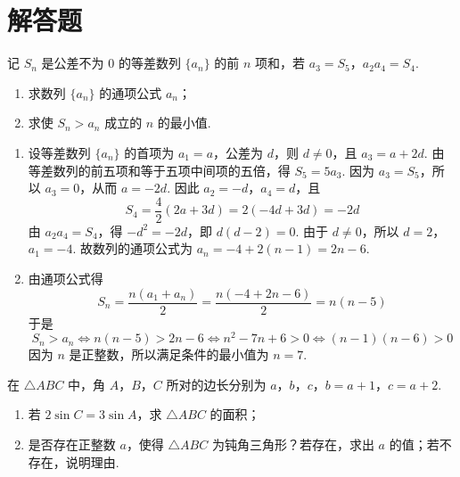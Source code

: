 \section{解答题}

\begin{problem}
记 \(S_n\) 是公差不为 \(0\) 的等差数列 \(\{a_n\}\) 的前 \(n\) 项和，若 \(a_3=S_5\)，\(a_2a_4=S_4\).

\begin{enumerate}
\item 求数列 \(\{a_n\}\) 的通项公式 \(a_n\)；
\item 求使 \(S_n>a_n\) 成立的 \(n\) 的最小值.
\end{enumerate}
\end{problem}

\begin{solution}
\begin{enumerate}
\item 设等差数列 \(\{a_n\}\) 的首项为 \(a_1=a\)，公差为 \(d\)，则 \(d\ne0\)，且 \(a_3=a+2d\). 由等差数列的前五项和等于五项中间项的五倍，得 \(S_5=5a_3\). 因为 \(a_3=S_5\)，所以 \(a_3=0\)，从而 \(a=-2d\). 因此 \(a_2=-d\)，\(a_4=d\)，且
\[
S_4=\frac{4}{2}\left(2a+3d\right)=2\left(-4d+3d\right)=-2d
\]
由 \(a_2a_4=S_4\)，得 \(-d^2=-2d\)，即 \(d(d-2)=0\). 由于 \(d\ne0\)，所以 \(d=2\)，\(a_1=-4\). 故数列的通项公式为 \(a_n=-4+2(n-1)=2n-6\).

\item 由通项公式得
\[
S_n=\frac{n\left(a_1+a_n\right)}{2}=\frac{n\left(-4+2n-6\right)}{2}=n(n-5)
\]
于是
\[
S_n>a_n\iff n(n-5)>2n-6\iff n^2-7n+6>0\iff (n-1)(n-6)>0
\]
因为 \(n\) 是正整数，所以满足条件的最小值为 \(n=7\).
\end{enumerate}
\end{solution}


\begin{problem}
在 \(\triangle ABC\) 中，角 \(A\)，\(B\)，\(C\) 所对的边长分别为 \(a\)，\(b\)，\(c\)，\(b=a+1\)，\(c=a+2\).

\begin{enumerate}
\item 若 \(2\sin C=3\sin A\)，求 \(\triangle ABC\) 的面积；
\item 是否存在正整数 \(a\)，使得 \(\triangle ABC\) 为钝角三角形？若存在，求出 \(a\) 的值；若不存在，说明理由.
\end{enumerate}
\end{problem}

